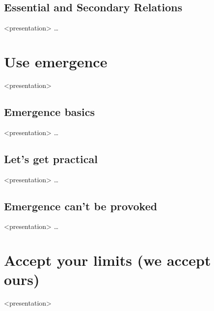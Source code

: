 %
\subsection{Essential and Secondary Relations}

  \begin{frame}<presentation>%
    \dots
  \end{frame}

\section{Use emergence}

  \begin{frame}<presentation>
    \tableofcontents[currentsection]
  \end{frame}

%
\subsection{Emergence basics}

  \begin{frame}<presentation>%
    \dots
  \end{frame}

%
\subsection{Let's get practical}

  \begin{frame}<presentation>%
    \dots
  \end{frame}

%
\subsection{Emergence can't be provoked}

  \begin{frame}<presentation>%
    \dots
  \end{frame}

\section{Accept your limits (we accept ours)}

  \begin{frame}<presentation>
    \tableofcontents[currentsection]
  \end{frame}

